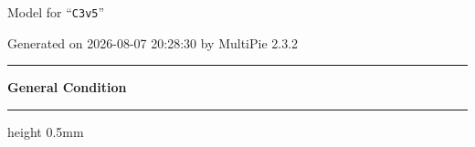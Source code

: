 \documentclass[fleqn,10pt,landscape]{jsarticle}
\begin{document}
\setcounter{MaxMatrixCols}{32}

\renewcommand{\tablename}{Table~}
\renewcommand{\figurename}{Figure~}
\setlength{\baselineskip}{16pt}
\setlength{\parindent}{0pt}
\setlength{\mathindent}{0pt}
\footnotesize
\begin{center}
\LARGE
Model for ``\texttt{C3v5}''
\end{center}
\begin{flushright}
Generated on 2026-08-07 20:28:30 by MultiPie 2.3.2
\end{flushright}
\setlength{\baselineskip}{16pt}
\footnotesize
\vspace{5mm}
\noindent \rule[0.5mm]{5mm}{0.5mm}\hspace{3mm}\textbf{General Condition}\hspace{3mm}\leaders\hrule height 0.5mm\hfill\kern0pt
\vspace{3mm}
\end{document}
